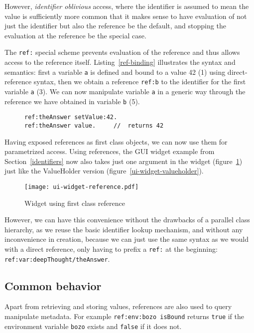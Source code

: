 \documentclass[preprint,authoryear]{llncs}
\begin{document}
However, \emph{identifier oblivious} access, where the identifier is assumed to mean the
value is sufficiently more common that it makes sense to have evaluation of not just
the identifier but also the reference be the default, and stopping the evaluation at the
reference be the special case.

The {\tt ref:} special scheme prevents evaluation of the reference and thus allows access
to the reference itself.  Listing~\ref{ref-binding} illustrates the syntax and semantics:
first a variable {\tt a} is defined and bound to a value 42 (1) using direct-reference syntax,
then we obtain a reference {\tt ref:b} to
the identifier for the first variable {\tt a} (3).  We can now manipulate variable {\tt a} 
in a generic way through the reference we have obtained in variable {\tt b} (5).  

\begin{figure}[htbp]
\begin{lstlisting}[style=numbers,label=ref-binding,caption=Accessing a variable via its reference.]
ref:theAnswer setValue:42.  
ref:theAnswer value.     //  returns 42
\end{lstlisting}
\end{figure}

Having exposed references as first class objects, we can now use them for parametrized 
access.   Using references, the GUI widget example from Section~\ref{identifiers} now
also takes just one argument in the widget (figure~\ref{ui-widget-reference}) just like
the ValueHolder version (figure~\ref{ui-widget-valueholder}).

\begin{figure}[htbp]
\begin{center}
\texttt{[image: ui-widget-reference.pdf]}
\caption{Widget using first class reference}
\label{ui-widget-reference}
\end{center}
\end{figure}

However, we can have this convenience without the drawbacks of a parallel class
hierarchy, as we reuse the basic identifier lookup mechanism, and without any
inconvenience in creation, because we can just use the same syntax as we would
with a direct reference, only having to prefix a {\tt ref:} at the beginning:  {\tt ref:var:deepThought/theAnswer}.


\subsection{Common behavior}
\label{common-reference-behavior}
Apart from retrieving and storing values, references are also used to query manipulate
metadata.  For example {\tt ref:env:bozo isBound} returns {\tt true} if the environment
variable {\tt bozo} exists and {\tt false} if it does not.
\end{document}
